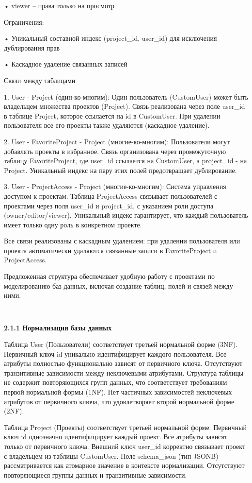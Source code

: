 • viewer – права только на просмотр

Ограничения:

• Уникальный составной индекс (project\_id, user\_id) для исключения дублирования прав

• Каскадное удаление связанных записей

Связи между таблицами

1. User - Project (один-ко-многим):
Один пользователь (CustomUser) может быть владельцем множества проектов (Project). Связь реализована через поле user\_id в таблице Project, которое ссылается на id в CustomUser. При удалении пользователя все его проекты также удаляются (каскадное удаление).

2. User - FavoriteProject - Project (многие-ко-многим):
Пользователи могут добавлять проекты в избранное. Связь организована через промежуточную таблицу FavoriteProject, где user\_id ссылается на CustomUser, а project\_id - на Project. Уникальный индекс на пару этих полей предотвращает дублирование.

3. User - ProjectAccess - Project (многие-ко-многим):
Система управления доступом к проектам. Таблица ProjectAccess связывает пользователей с проектами через поля user\_id и project\_id, с указанием роли доступа (owner/editor/viewer). Уникальный индекс гарантирует, что каждый пользователь имеет только одну роль в конкретном проекте.

Все связи реализованы с каскадным удалением: при удалении пользователя или проекта автоматически удаляются связанные записи в FavoriteProject и ProjectAccess.


Предложенная структура обеспечивает удобную работу с проектами по моделированию баз данных, включая создание таблиц, полей и связей между ними. 

\

\textbf{\large 2.1.1 Нормализация базы данных}

Таблица User (Пользователи) соответствует третьей нормальной форме (3NF). Первичный ключ id уникально идентифицирует каждого пользователя.
Все атрибуты полностью функционально зависят от первичного ключа. 
Отсутствуют транзитивные зависимости между неключевыми атрибутами. Структура таблицы не содержит повторяющихся групп данных, что соответствует требованиям первой нормальной формы (1NF). Нет частичных зависимостей неключевых атрибутов от первичного ключа, что удовлетворяет второй нормальной форме (2NF).

Таблица Project (Проекты) соответствует третьей нормальной форме. Первичный ключ id однозначно идентифицирует каждый проект. Все атрибуты зависят только от первичного ключа. 
Внешний ключ user\_id корректно связывает проект с владельцем из таблицы CustomUser. Поле schema\_json (тип JSONB) рассматривается как атомарное значение в контексте нормализации. Отсутствуют повторяющиеся группы данных и транзитивные зависимости.

